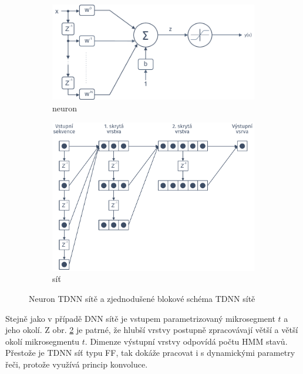 \begin{figure}[htpb]
  \centering
  \begin{subfigure}[b]{0.45\textwidth}
    \includegraphics[width=\textwidth]{./ch4-asr/img/neuron-tdnn.pdf}
    \caption{neuron}
    \label{fig:asr:acoustic:dnn:tdnn:neuron}
  \end{subfigure}
  \begin{subfigure}[b]{0.35\textwidth}
    \includegraphics[width=\textwidth]{./ch4-asr/img/tdnn.pdf}
    \caption{síť}
    \label{fig:asr:acoustic:dnn:tdnn:net}
  \end{subfigure}
  \caption{Neuron TDNN sítě a zjednodušené blokové schéma TDNN sítě \cite{Craig2000}}
  \label{fig:asr:acoustic:dnn:tdnn}
\end{figure}

Stejně jako v případě DNN sítě je vstupem parametrizovaný mikrosegment $t$ a jeho okolí. Z obr. \ref{fig:asr:acoustic:dnn:tdnn:net} je patrné, že hlubší vrstvy postupně zpracovávají větší a větší okolí mikrosegmentu $t$. Dimenze výstupní vrstvy odpovídá počtu HMM stavů. Přestože je TDNN síť typu FF, tak dokáže pracovat i s dynamickými parametry řeči, protože využívá princip konvoluce.
